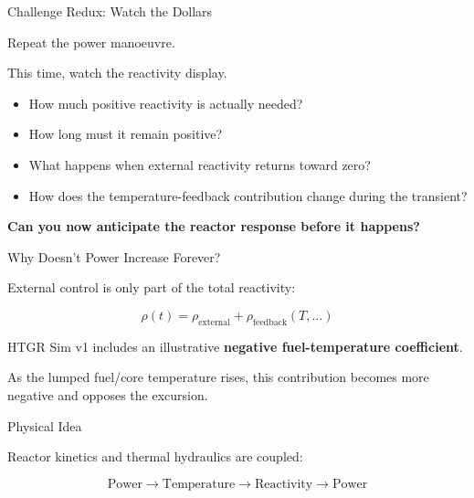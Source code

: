 \documentclass[aspectratio=169]{beamer}
\begin{document}
\begin{frame}{Challenge Redux: Watch the Dollars}

    Repeat the power manoeuvre.

    This time, watch the reactivity display.

    \vspace{1em}

    \begin{itemize}

        \item How much positive reactivity is actually needed?

        \item How long must it remain positive?

        \item What happens when external reactivity returns toward zero?

        \item How does the temperature-feedback contribution change during the
              transient?

    \end{itemize}

    \vspace{1em}

    \centering

    \textbf{
        Can you now anticipate the reactor response before it happens?
    }

\end{frame}



\begin{frame}{Why Doesn't Power Increase Forever?}

    External control is only part of the total reactivity:

    \[
        \rho(t)
        =
        \rho_{\mathrm{external}}
        +
        \rho_{\mathrm{feedback}}(T,\ldots)
    \]

    \vspace{1em}

    HTGR Sim v1 includes an illustrative
    \textbf{negative fuel-temperature coefficient}.

    As the lumped fuel/core temperature rises, this contribution becomes more
    negative and opposes the excursion.

    \vspace{1em}

    \begin{block}{Physical Idea}

        Reactor kinetics and thermal hydraulics are coupled:

        \[
            \text{Power}
            \rightarrow
            \text{Temperature}
            \rightarrow
            \text{Reactivity}
            \rightarrow
            \text{Power}
        \]

    \end{block}

\end{frame}
\end{document}
